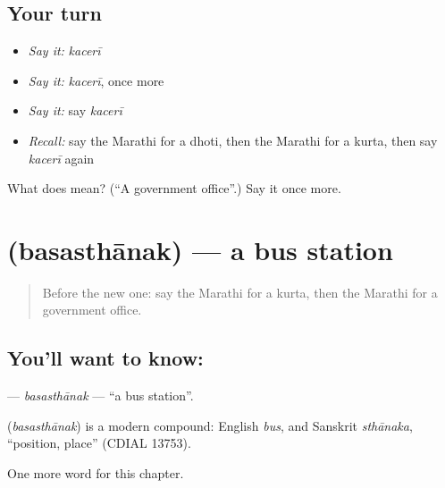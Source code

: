 \subsection*{Your turn}
\begin{itemize}
\raggedright
  \item \emph{Say it:} \emph{kacerī}
  \item \emph{Say it:} \emph{kacerī}, once more
  \item \emph{Say it:} say \emph{kacerī}
  \item \emph{Recall:} say the Marathi for a dhoti, then the Marathi for a kurta, then say \emph{kacerī} again
\end{itemize}

\begin{tcolorbox}[breakable,colback=teal!4,colframe=teal!35!black,title={Before you move on}]
What does  mean? (\textquotedblleft{}A government office\textquotedblright{}.) Say it once more.
\end{tcolorbox}
\section[\texorpdfstring{\mr{बसस्थानक} (basasthānak)}{बसस्थानक (basasthānak)}]{ (basasthānak) — a bus station}

\label{lesson:MR-C271-basasthanak}



\begin{quote}
Before the new one: say the Marathi for a kurta, then the Marathi for a government office.
\end{quote}

\subsection*{You'll want to know: }
\textbf{} — \emph{basasthānak} — \textquotedblleft{}a bus station\textquotedblright{}.

\begin{cousinweb}
\textbf{} (\emph{basasthānak}) is a modern compound: English \emph{bus}, and Sanskrit \emph{sthānaka}, \textquotedblleft{}position, place\textquotedblright{} (CDIAL 13753).
\end{cousinweb}

\begin{grammarlens}[title={What you've built}]
One more word for this chapter.
\end{grammarlens}

